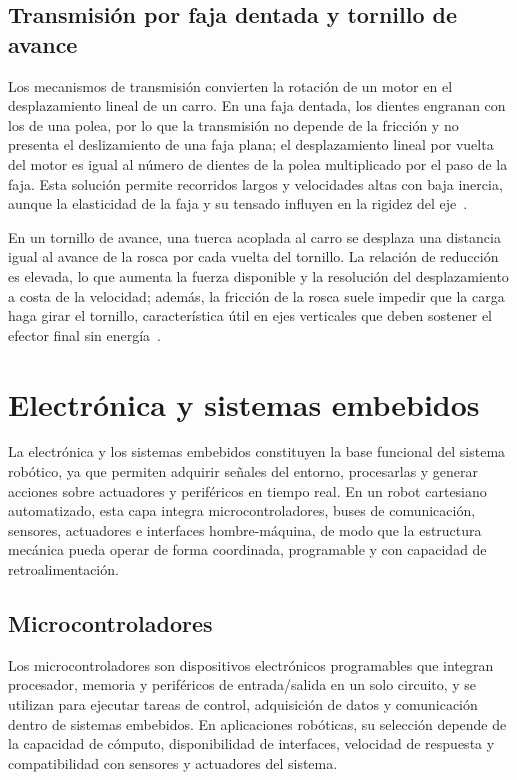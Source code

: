 \subsection{Transmisión por faja dentada y tornillo de avance}
Los mecanismos de transmisión convierten la rotación de un motor en el desplazamiento lineal de un carro. En una faja dentada, los dientes engranan con los de una polea, por lo que la transmisión no depende de la fricción y no presenta el deslizamiento de una faja plana; el desplazamiento lineal por vuelta del motor es igual al número de dientes de la polea multiplicado por el paso de la faja. Esta solución permite recorridos largos y velocidades altas con baja inercia, aunque la elasticidad de la faja y su tensado influyen en la rigidez del eje~\cite{bolton2015mechatronics}.

En un tornillo de avance, una tuerca acoplada al carro se desplaza una distancia igual al avance de la rosca por cada vuelta del tornillo. La relación de reducción es elevada, lo que aumenta la fuerza disponible y la resolución del desplazamiento a costa de la velocidad; además, la fricción de la rosca suele impedir que la carga haga girar el tornillo, característica útil en ejes verticales que deben sostener el efector final sin energía~\cite{bolton2015mechatronics}.


\section{Electrónica y sistemas embebidos}
La electrónica y los sistemas embebidos constituyen la base funcional del sistema robótico, ya que permiten adquirir señales del entorno, procesarlas y generar acciones sobre actuadores y periféricos en tiempo real. En un robot cartesiano automatizado, esta capa integra microcontroladores, buses de comunicación, sensores, actuadores e interfaces hombre-máquina, de modo que la estructura mecánica pueda operar de forma coordinada, programable y con capacidad de retroalimentación.

\subsection{Microcontroladores}
Los microcontroladores son dispositivos electrónicos programables que integran procesador, memoria y periféricos de entrada/salida en un solo circuito, y se utilizan para ejecutar tareas de control, adquisición de datos y comunicación dentro de sistemas embebidos. En aplicaciones robóticas, su selección depende de la capacidad de cómputo, disponibilidad de interfaces, velocidad de respuesta y compatibilidad con sensores y actuadores del sistema.

